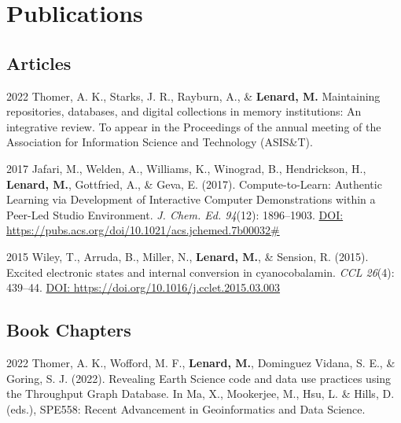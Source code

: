 \documentclass[12pt,letterpaper]{report}
\begin{document}
\section*{Publications}

\subsection*{Articles}

\begin{tablist}
   
        \item[2022] \tab Thomer, A. K., Starks, J. R., Rayburn, A., \& \textbf{Lenard, M.} Maintaining repositories, databases, and digital collections in memory institutions: An integrative review. To appear in the Proceedings of the annual meeting of the Association for Information Science and Technology (ASIS\&T).
        
        \item[2017] \tab Jafari, M., Welden, A., Williams, K., Winograd, B., Hendrickson, H., \textbf{Lenard, M.}, Gottfried, A., \& Geva, E. (2017). Compute-to-Learn: Authentic Learning via Development of Interactive Computer Demonstrations within a Peer-Led Studio Environment. \textit{J. Chem. Ed. 94}(12): 1896--1903. \href{https://pubs.acs.org/doi/10.1021/acs.jchemed.7b00032\#}{DOI: https://pubs.acs.org/doi/10.1021/acs.jchemed.7b00032\#}

        \item[2015] \tab Wiley, T., Arruda, B., Miller, N., \textbf{Lenard, M.}, \& Sension, R. (2015). Excited electronic states and internal conversion in cyanocobalamin. \textit{CCL 26}(4): 439--44. \href{https://doi.org/10.1016/j.cclet.2015.03.003}{DOI: https://doi.org/10.1016/j.cclet.2015.03.003}

\end{tablist}

\subsection*{Book Chapters}

\begin{tablist}

	\item[2022] \tab Thomer, A. K., Wofford, M. F., \textbf{Lenard, M.}, Dominguez Vidana, S. E., \& Goring, S. J. (2022). Revealing Earth Science code and data use practices using the Throughput Graph Database. In Ma, X., Mookerjee, M., Hsu, L. \& Hills, D. (eds.), SPE558: Recent Advancement in Geoinformatics and Data Science.
	
\end{tablist}
\end{document}
